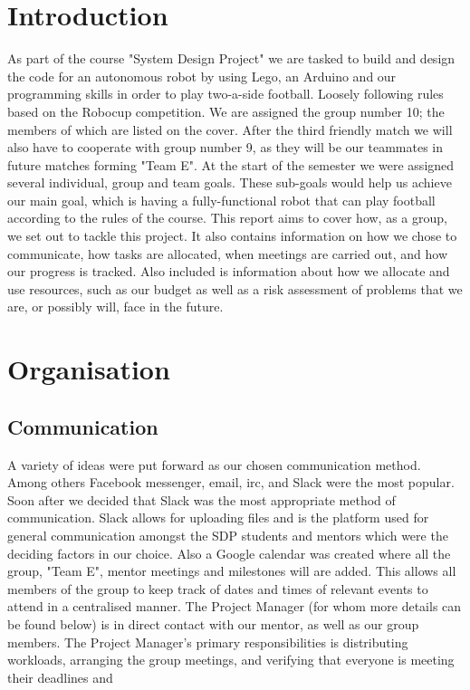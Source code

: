 \documentclass{article}
\begin{document}
\section{Introduction}
As part of the course "System Design Project" we are tasked to build and design
the code for an autonomous robot by using Lego, an Arduino and our programming
skills in order to play two-a-side football. Loosely following rules based on
the Robocup competition. We are assigned the group number 10; the members of
which are listed on the cover. After the third friendly match we will also have
to cooperate with group number 9, as they will be our teammates in future
matches forming "Team E". At the start of the semester we were assigned several
individual, group and team goals. These sub-goals would help us achieve our main
goal, which is having a fully-functional robot that can play football according
to the rules of the course. This report aims to cover how, as a group, we set
out to tackle this project. It also contains information on how we chose to
communicate, how tasks are allocated, when meetings are carried out, and how our
progress is tracked. Also included is information about how we allocate and use
resources, such as our budget as well as a risk assessment of problems that we
are, or possibly will, face in the future.

\section{Organisation}
\subsection{Communication}
A variety of ideas were put forward as our chosen communication method. Among
others Facebook messenger, email, irc, and Slack were the most popular. Soon
after we decided that Slack was the most appropriate method of communication.
Slack allows for uploading files and is the platform used for general
communication amongst the SDP students and mentors which were the deciding
factors in our choice. Also a Google calendar was created where all the group,
"Team E", mentor meetings and milestones will are added. This allows all members
of the group to keep track of dates and times of relevant events to attend in a
centralised manner. The Project Manager (for whom more details can be found
below) is in direct contact with our mentor, as well as our group members. The
Project Manager's primary responsibilities is distributing workloads, arranging
the group meetings, and verifying that everyone is meeting their deadlines and
\end{document}
